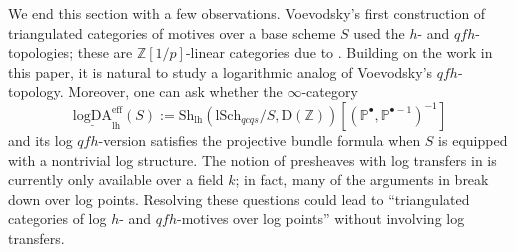 \documentclass[10pt]{amsart}
\renewcommand{\P}{\mathbb{P}}
\newcommand{\Z}{\mathbb{Z}}
\newcommand{\rD}{\mathrm{D}}
\newcommand{\ul}{\underline}
\newcommand{\lh}{\mathrm{lh}}
\newcommand{\Sh}{\mathrm{Sh}}
\newcommand{\lSch}{\mathrm{lSch}}
\newcommand{\eff}{\mathrm{eff}}
\begin{document}
We end this section with a few observations.
Voevodsky's first construction of triangulated categories of motives over a base scheme $S$ 
\cite[\S 4.1]{Voevodsky-Homology} used the $h$- and $qfh$-topologies; 
these are $\Z[1/p]$-linear categories due to \cite[Proposition 4.1.7]{Voevodsky-Homology}.
Building on the work in this paper, 
it is natural to study a logarithmic analog of Voevodsky's $qfh$-topology. 
Moreover, 
one can ask whether the $\infty$-category
\[
\ul{\mathrm{logDA}}_{\lh}^\eff(S):=\Sh_{\lh}(\lSch_{qcqs}/S,\rD(\mathrm{\Z}))
[(\P^\bullet,\P^{\bullet-1})^{-1}]
\]
and its log $qfh$-version satisfies the projective bundle formula 
\cite[Theorem 4.2.7]{Voevodsky-Homology} when $S$ is equipped with a nontrivial log structure.
The notion of presheaves with log transfers in \cite[Definition 4.1.1]{logDM} is currently only 
available over a field $k$; in fact, 
many of the arguments in \cite{logDM} break down over log points.
Resolving these questions could lead to 
``triangulated categories of log $h$- and $qfh$-motives over log points'' 
without involving log transfers.




\end{document}
